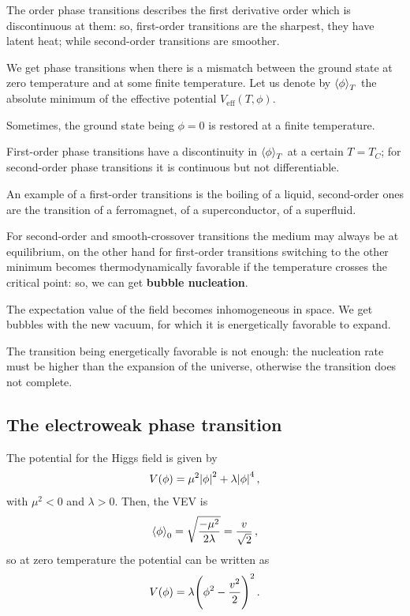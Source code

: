 \documentclass[main.tex]{subfiles}
\begin{document}
The order phase transitions describes the first derivative order which is discontinuous at them: so, first-order transitions are the sharpest, they have latent heat; while second-order transitions are smoother. 

We get phase transitions when there is a mismatch between the ground state at zero temperature and at some finite temperature. Let us denote by \(\expval{\phi }_{T}\) the absolute minimum of the effective potential \(V  _{\text{eff}} (T, \phi )\). 

Sometimes, the ground state being \(\phi = 0\) is restored at a finite temperature. 

First-order phase transitions have a discontinuity in \(\expval{\phi }_{T}\) at a certain \(T = T_C\); for second-order phase transitions it is continuous but not differentiable. 

An example of a first-order transitions is the boiling of a liquid, second-order ones are the transition of a ferromagnet, of a superconductor, of a superfluid.

For second-order and smooth-crossover transitions the medium may always be at equilibrium, on the other hand for first-order transitions switching to the other minimum becomes thermodynamically favorable if the temperature crosses the critical point: so, we can get \textbf{bubble nucleation}. 

The expectation value of the field becomes inhomogeneous in space. We get bubbles with the new vacuum, for which it is energetically favorable to expand. 

The transition being energetically favorable is not enough: the nucleation rate must be higher than the expansion of the universe, otherwise the transition does not complete. 

\subsection{The electroweak phase transition}

The potential for the Higgs field is given by 
%
\begin{align}
V(\phi ) = \mu^2 \abs{\phi }^2 + \lambda \abs{\phi }^{4}
\,,
\end{align}
%
with \(\mu^2<0\) and \(\lambda >0\). Then, the VEV is 
%
\begin{align}
\expval{\phi }_0 = \sqrt{\frac{- \mu^2}{2 \lambda }} = \frac{v}{\sqrt{2}}
\,,
\end{align}
%
so at zero temperature the potential can be written as 
%
\begin{align}
V(\phi) = \lambda \qty(\phi^2 - \frac{v^2}{2})^2
\,.
\end{align}
\end{document}
